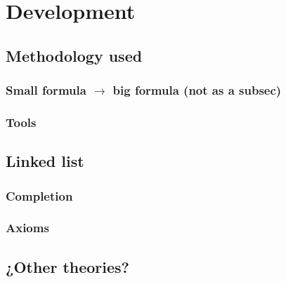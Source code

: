 \chapter{Development\label{sec:develpment}}


\section{Methodology used}

\subsection{Small formula $\rightarrow$ big formula (not as a subsec)}

\subsection{Tools}

\section{Linked list}

\subsection{Completion}
\subsection{Axioms}

\section{¿Other theories?}